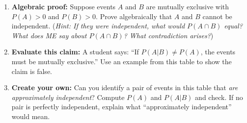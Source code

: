 \documentclass[10pt]{article}
\begin{document}
\begin{tcolorbox}[colback=goldbg, colframe=goldacc, boxrule=0.9pt, arc=2mm,
    left=3mm, right=3mm, top=2mm, bottom=2mm,
    title={\bfseries\small Tier E --- Extension: Proving the ME/Independence Distinction},
    fonttitle=\small]
\small
\begin{enumerate}[leftmargin=1.5em, itemsep=10pt]
  \item \textbf{Algebraic proof:} Suppose events $A$ and $B$ are mutually exclusive
        with $P(A) > 0$ and $P(B) > 0$. Prove algebraically that $A$ and $B$ cannot
        be independent. (\textit{Hint: If they were independent, what would $P(A \cap B)$
        equal? What does ME say about $P(A \cap B)$? What contradiction arises?})\\
        \writeline\writeline\writeline\writeline

  \item \textbf{Evaluate this claim:} A student says: ``If $P(A|B) \neq P(A)$, the events
        must be mutually exclusive.'' Use an example from this table to show the claim
        is false.\\
        \writeline\writeline\writeline

  \item \textbf{Create your own:} Can you identify a pair of events in this table
        that \emph{are approximately independent}? Compute $P(A)$ and $P(A|B)$ and
        check. If no pair is perfectly independent, explain what ``approximately
        independent'' would mean.\\
        \writeline\writeline\writeline
\end{enumerate}
\end{tcolorbox}
\end{document}
